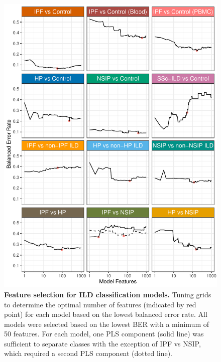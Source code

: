\documentclass[
]{article}
\begin{document}
\begin{figure}

{\centering \includegraphics[width=1\linewidth,]{./Figures/SysReview/FigE2_tuning} 

}

\caption[Model tuning]{\textbf{Feature selection for ILD classification models.} Tuning grids to determine the optimal number of features (indicated by red point) for each model based on the lowest balanced error rate. All models were selected based on the lowest BER with a minimum of 50 features. For each model, one PLS component (solid line) was sufficient to separate classes with the exception of IPF vs NSIP, which required a second PLS component (dotted line).}\label{fig:tuningMINT}
\end{figure}
\end{document}
